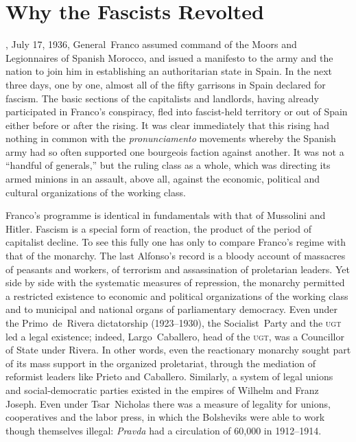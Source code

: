 \chapter{Why the Fascists Revolted}

, July 17, 1936, General~Franco{\indexFFranco} assumed command of the Moors and Legionnaires of Spanish Morocco, and issued a manifesto to the army and the nation to join him in establishing an authoritarian state in Spain. In the next three days, one by one, almost all of the fifty garrisons in Spain declared for fascism. The basic sections of the capitalists and landlords, having already participated in Franco’s conspiracy, fled into fascist-held territory or out of Spain either before or after the rising. It was clear immediately that this rising had nothing in common with the \emph{pronunciamento} movements whereby the Spanish army had so often supported one bourgeois faction against another. It was not a ``handful of generals,'' but the ruling class as a whole, which was directing its armed minions in an assault, above all, against the economic, political and cultural organizations of the working class.

Franco’s programme is identical in fundamentals with that of Mussolini and Hitler. Fascism is a special form of reaction, the product of the period of capitalist decline. To see this fully one has only to compare Franco’s regime with that of the monarchy. The last Alfonso’s record is a bloody account of massacres of peasants and workers, of terrorism and assassination of proletarian leaders. Yet side by side with the systematic measures of repression, the monarchy permitted a restricted existence to economic and political organizations of the working class and to municipal and national organs of parliamentary democracy. Even under the Primo~de~Rivera dictatorship (1923--1930), the Socialist~Party and the \textsc{ugt} led a legal existence; indeed, Largo~Caballero{\indexLCaballero}, head of the \textsc{ugt}, was a Councillor of State under Rivera. In other words, even the reactionary monarchy sought part of its mass support in the organized proletariat, through the mediation of reformist leaders like Prieto and Caballero. Similarly, a system of legal unions and social-democratic parties existed in the empires of Wilhelm and Franz Joseph. Even under Tsar~Nicholas there was a measure of legality for unions, cooperatives and the labor press, in which the Bolsheviks were able to work though themselves illegal: \emph{Pravda} had a circulation of 60,000 in 1912--1914.

